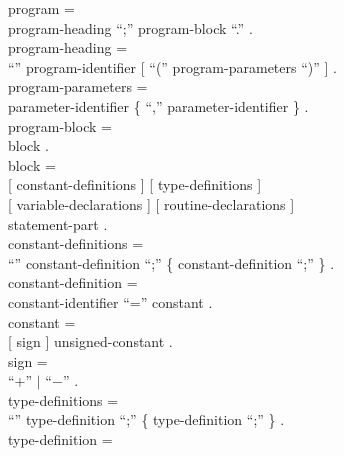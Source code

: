 \begin{grammar}
  {\GA}program =                                          \\
    {\GB}program-heading ``;'' program-block ``.'' .      \\
  {\GA}program-heading =                                  \\
    {\GB}``{\Program}'' program-identifier
           [ ``('' program-parameters ``)'' ] .           \\
  {\GA}program-parameters =                               \\
    {\GB}parameter-identifier
           \{ ``,'' parameter-identifier \} .             \\
  {\GA}program-block =                                    \\
    {\GB}block .                                          \\
  {\GA}block =                                            \\
    {\GB}[ constant-definitions ]
           [ type-definitions ]                           \\
      {\GC}[ variable-declarations ]
             [ routine-declarations ]                     \\
        {\GD}statement-part .                             \\
  {\GA}constant-definitions =                             \\
    {\GB}``{\Const}'' constant-definition ``;''
            \{ constant-definition ``;'' \} .             \\
  {\GA}constant-definition =                              \\
    {\GB}constant-identifier ``='' constant .             \\
  {\GA}constant =                                         \\
    {\GB}[ sign ] unsigned-constant .                     \\
  {\GA}sign =                                             \\
    {\GB}``+'' $|$ ``$-$'' .                              \\
  {\GA}type-definitions =                                 \\
    {\GB}``{\Type}'' type-definition ``;''
           \{ type-definition ``;'' \} .                  \\
  {\GA}type-definition =                                  \\

\end{grammar}
